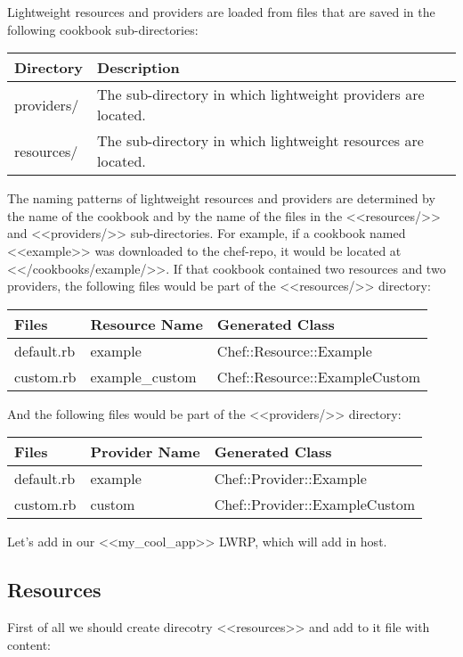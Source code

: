 Lightweight resources and providers are loaded from files that are saved in the following cookbook sub-directories:

\begin{tabular}{ | l | l | }
  \hline
  Directory	& Description \\
  \hline
  providers/ & The sub-directory in which lightweight providers are located. \\
  resources/ & The sub-directory in which lightweight resources are located. \\
  \hline
\end{tabular}

The naming patterns of lightweight resources and providers are determined by the name of the cookbook and by the name of the files in the <<resources/>> and <<providers/>> sub-directories. For example, if a cookbook named <<example>> was downloaded to the chef-repo, it would be located at <</cookbooks/example/>>. If that cookbook contained two resources and two providers, the following files would be part of the <<resources/>> directory:

\begin{tabular}{ | l | l | l | }
  \hline
  Files	& Resource Name	& Generated Class \\
  \hline
  default.rb & example & Chef::Resource::Example \\
  custom.rb	& example\_custom & Chef::Resource::ExampleCustom \\
  \hline
\end{tabular}

And the following files would be part of the <<providers/>> directory:

\begin{tabular}{ | l | l | l | }
  \hline
  Files	& Provider Name	& Generated Class \\
  \hline
  default.rb & example & Chef::Provider::Example \\
  custom.rb	& custom & Chef::Provider::ExampleCustom \\
  \hline
\end{tabular}

Let's add in our <<my\_cool\_app>> LWRP, which will add in  host.

\subsection{Resources}

First of all we should create direcotry <<resources>> and add to it  file with content:

